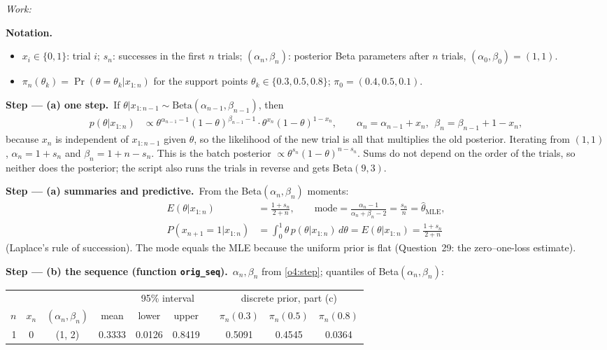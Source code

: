 \documentclass[11pt,a4paper]{article}
\newif\ifsolucoes
\newcommand{\espacoresol}{4.5cm}   %
\newenvironment{notacao}{\par\smallskip\noindent\textbf{Notation.}\begin{itemize}[leftmargin=1.4em,topsep=1pt,itemsep=0pt]\small}{\end{itemize}}
\newcommand{\resolespaco}{\ifsolucoes\else\par\textit{Work:}\vspace{\espacoresol}\par\fi}
\newcommand{\passo}[2]{\par\smallskip\noindent\textbf{Step --- #1.}~#2}
\begin{document}
\resolespaco
\begin{sol}
\begin{notacao}
\item $x_i\in\{0,1\}$: trial $i$; $s_n$: successes in the first $n$ trials; $(\alpha_n,\beta_n)$: posterior Beta parameters after $n$ trials, $(\alpha_0,\beta_0)=(1,1)$.
\item $\pi_n(\theta_k)=\Pr(\theta=\theta_k|x_{1:n})$ for the support points $\theta_k\in\{0.3,0.5,0.8\}$; $\pi_0=(0.4,0.5,0.1)$.
\end{notacao}
\passo{(a) one step}{If $\theta|x_{1:n-1}\sim\text{Beta}(\alpha_{n-1},\beta_{n-1})$, then
\begin{align}
p(\theta|x_{1:n})&\propto\theta^{\alpha_{n-1}-1}(1-\theta)^{\beta_{n-1}-1}\cdot\theta^{x_n}(1-\theta)^{1-x_n},\qquad\alpha_n=\alpha_{n-1}+x_n,\ \ \beta_n=\beta_{n-1}+1-x_n,\label{o4:step}
\end{align}
because $x_n$ is independent of $x_{1:n-1}$ given $\theta$, so the likelihood of the new trial is all that multiplies the old posterior. Iterating from $(1,1)$, $\alpha_n=1+s_n$ and $\beta_n=1+n-s_n$. This is the batch posterior $\propto\theta^{s_n}(1-\theta)^{n-s_n}$. Sums do not depend on the order of the trials, so neither does the posterior; the script also runs the trials in reverse and gets Beta$(9,3)$.}
\passo{(a) summaries and predictive}{From the Beta$(\alpha_n,\beta_n)$ moments:
\begin{align}
E(\theta|x_{1:n})&=\frac{1+s_n}{2+n},\qquad\text{mode}=\frac{\alpha_n-1}{\alpha_n+\beta_n-2}=\frac{s_n}{n}=\hat\theta_{\text{MLE}},\label{o4:mm}\\
P(x_{n+1}=1|x_{1:n})&=\int_0^1\theta\,p(\theta|x_{1:n})\,d\theta=E(\theta|x_{1:n})=\frac{1+s_n}{2+n}\label{o4:pred}
\end{align}
(Laplace's rule of succession). The mode equals the MLE because the uniform prior is flat (Question~29: the zero--one-loss estimate).}
\passo{(b) the sequence (function \texttt{orig\_seq})}{$\alpha_n,\beta_n$ from \eqref{o4:step}; quantiles of Beta$(\alpha_n,\beta_n)$:
\begin{center}\small
\begin{tabular}{rcccccc@{\qquad}ccc}
\toprule
& & & & \multicolumn{2}{c}{95\% interval} & & \multicolumn{3}{c}{discrete prior, part (c)}\\
\cmidrule(lr){5-6}\cmidrule(lr){8-10}
$n$ & $x_n$ & $(\alpha_n,\beta_n)$ & mean & lower & upper & & $\pi_n(0.3)$ & $\pi_n(0.5)$ & $\pi_n(0.8)$\\
\midrule
1 & 0 & (1, 2) & 0.3333 & 0.0126 & 0.8419 & & 0.5091 & 0.4545 & 0.0364\\

\end{tabular}
\end{center}}
\end{sol}
\end{document}
